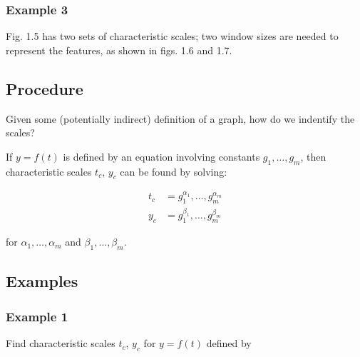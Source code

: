 \documentclass[12pt]{article}
\begin{document}
\subsubsection{Example 3}

Fig. 1.5 has two sets of characteristic scales; two window sizes are needed to
represent the features, as shown in figs. 1.6 and 1.7.

\subsection{Procedure}
Given some (potentially indirect) definition of a graph, how do we indentify the
scales?

If $y=f(t)$ is defined by an equation involving constants $g_1, \ldots, g_m$,
then characteristic scales $t_c$, $y_c$ can be found by solving:

\begin{equation}
  \begin{aligned}
    t_c &= g_1^{\alpha_1}, \ldots, g_m^{\alpha_m} \\
    y_c &= g_1^{\beta_1}, \ldots, g_m^{\beta_m}
  \end{aligned}
\end{equation}

for $\alpha_1, \ldots, \alpha_m$ and $\beta_1, \ldots, \beta_m$.

\subsection{Examples}
\subsubsection{Example 1}

Find characteristic scales $t_c$, $y_c$ for $y=f(t)$ defined by
\end{document}
